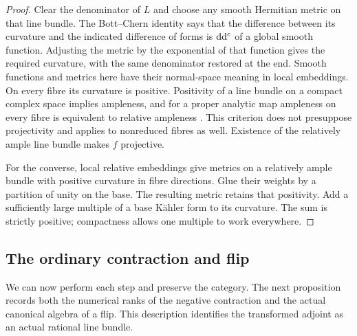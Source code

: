 \begin{proof}
Clear the denominator of $L$ and choose any smooth Hermitian metric
on that line bundle. The Bott--Chern identity says that the difference
between its curvature and the indicated difference of forms is
$\mathrm{d}\mathrm{d}^{c}$ of a global smooth function. Adjusting the metric by the
exponential of that function gives the required curvature, with the
same denominator restored at the end. Smooth functions and metrics
here have their normal-space meaning in local embeddings.
On every fibre its curvature is positive.  Positivity of a line bundle
on a compact complex space implies ampleness, and for a proper analytic
map ampleness on every fibre is equivalent to relative ampleness
\cite[Corollary~1.12 and Definition~3.1--Remark~3.2]{FujinoVanishing2026}.
This criterion does not presuppose projectivity and applies to
nonreduced fibres as well.  Existence of the relatively ample line bundle
makes $f$ projective.

For the converse, local relative embeddings give metrics on a relatively
ample bundle with positive curvature in fibre directions.  Glue their
weights by a partition of unity on the base.  The resulting metric
retains that positivity.  Add a sufficiently large multiple of a base
K\"ahler form to its curvature.  The sum is strictly positive; compactness
allows one multiple to work everywhere.
\end{proof}

\subsection{The ordinary contraction and flip}

We can now perform each step and preserve the category.  The next
proposition records both the numerical ranks of the negative contraction
and the actual canonical algebra of a flip.  This description identifies the transformed adjoint as an actual
rational line bundle.

